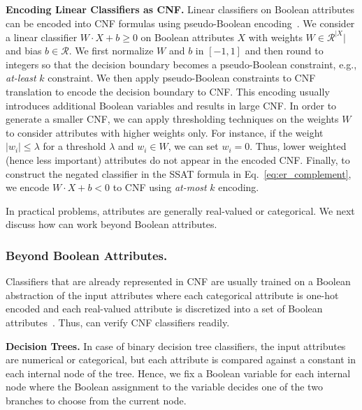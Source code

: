 \textbf{Encoding Linear Classifiers as CNF.} Linear classifiers on Boolean attributes can  be encoded into CNF formulas using pseudo-Boolean encoding~\cite{philipp2015pblib}. We consider a linear classifier  $ W\cdot X + b \ge 0 $ on Boolean attributes $ X $ with weights $ W \in \mathcal{R}^{|X}| $ and bias $ b \in \mathcal{R} $.  We first normalize $ W$ and $b $ in $ [-1,1] $ and then round to integers so that the decision boundary becomes a pseudo-Boolean constraint, e.g., \textit{at-least} $ k $ constraint.  We then apply  pseudo-Boolean constraints to CNF translation to encode the decision boundary to CNF. This encoding usually introduces additional Boolean variables and results in large CNF. In order to generate a smaller CNF, we can apply thresholding techniques on the weights $ W $ to consider attributes with higher weights only. For instance, if the weight $  |w_i| \le \lambda $ for a threshold $ \lambda $ and $ w_i \in W $, we can set $ w_i = 0 $. Thus,  lower weighted (hence less important) attributes do not appear in the encoded CNF.  Finally, to construct the negated classifier in the SSAT formula in Eq.~\ref{eq:er_complement}, we encode $ W\cdot X + b < 0 $ to CNF using \textit{at-most} $ k $ encoding. 

In practical problems, attributes are generally real-valued or categorical. We next discuss how {\framework} can work beyond Boolean attributes. 


\subsubsection{Beyond Boolean Attributes.}
Classifiers that are already represented in CNF are usually trained on a Boolean abstraction of the input attributes where  each categorical attribute is one-hot encoded  and each real-valued attribute is discretized into a set of Boolean attributes~\cite{LKCL2019,GMM20}. Thus, {\framework} can verify CNF classifiers readily. 

\textbf{Decision Trees.} In case of binary decision tree classifiers, the input attributes are numerical or categorical, but each attribute is compared against a constant in each internal node of the tree. Hence, we fix a Boolean variable for each internal node where the Boolean assignment to the variable decides one of the two branches to choose from the current node.  


